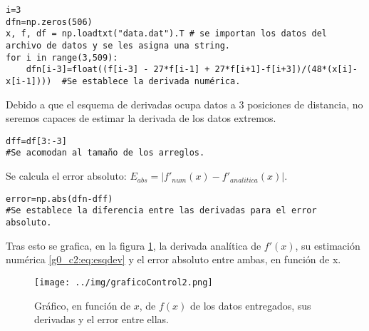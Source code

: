 \documentclass[../portafolio.tex]{subfiles}
\begin{document}
\begin{verbatim}
i=3
dfn=np.zeros(506)
x, f, df = np.loadtxt("data.dat").T # se importan los datos del archivo de datos y se les asigna una string.
for i in range(3,509):
    dfn[i-3]=float((f[i-3] - 27*f[i-1] + 27*f[i+1]-f[i+3])/(48*(x[i]-x[i-1])))	#Se establece la derivada numérica.
\end{verbatim}
Debido a que el esquema de derivadas ocupa datos a 3 posiciones de distancia, no seremos capaces de estimar la derivada de los datos extremos.
\begin{verbatim}
dff=df[3:-3]
#Se acomodan al tamaño de los arreglos.
\end{verbatim}
Se calcula el error absoluto: $E_{abs}=\left| f'_{num}(x) - f'_{analitica}(x) \right|$.
\begin{verbatim}
error=np.abs(dfn-dff)
#Se establece la diferencia entre las derivadas para el error absoluto.
\end{verbatim}

Tras esto se grafica, en la figura \ref{g0_c2:fig:control_2}, la derivada analítica de  $f'(x)$, su estimación numérica \eqref{g0_c2:eq:esqdev} y el error absoluto entre ambas, en función de x.

\begin{figure}
\centering
\texttt{[image: ../img/graficoControl2.png]} 
\caption{Gráfico, en función de $x$, de $f(x)$ de los datos entregados, sus derivadas y el error entre ellas.}\label{g0_c2:fig:control_2}
\end{figure}
\end{document}

